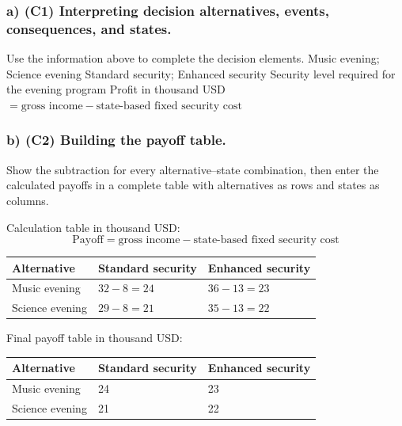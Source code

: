 \subsubsection*{a) \textbf{(C1)} Interpreting decision alternatives, events, consequences, and states.}
\label{subsec:problem7-museum-evening-program-c1}
Use the information above to complete the decision elements.
\DecisionElementsTable
{Music evening; Science evening}
{Standard security; Enhanced security}
{Security level required for the evening program}
{Profit in thousand USD $= \text{gross income} - \text{state-based fixed security cost}$}
\subsubsection*{b) \textbf{(C2)} Building the payoff table.}
\label{subsec:problem7-museum-evening-program-c2}
Show the subtraction for every alternative--state combination, then enter the calculated payoffs in a complete table with alternatives as rows and states as columns.

Calculation table in thousand USD:
\[
\text{Payoff}=\text{gross income}-\text{state-based fixed security cost}
\]
\begin{center}
\small
\begin{tabular}{lll}
\toprule
Alternative & Standard security & Enhanced security \\
\midrule
Music evening & $32 - 8 = 24$ & $36 - 13 = 23$ \\
Science evening & $29 - 8 = 21$ & $35 - 13 = 22$ \\
\bottomrule
\end{tabular}
\end{center}

Final payoff table in thousand USD:
\begin{center}
\begin{tabular}{lll}
\toprule
Alternative & Standard security & Enhanced security \\
\midrule
Music evening & 24 & 23 \\
Science evening & 21 & 22 \\
\bottomrule
\end{tabular}
\end{center}
